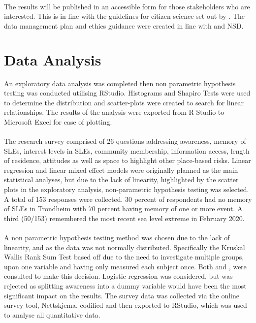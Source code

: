 \paragraph{}
The results will be published in an accessible form for those stakeholders who are interested. This is in line with the guidelines for citizen science set out by \cite{tweddle_guide_2012}. The data management plan and ethics guidance were created in line with \cite{nesh_guidelines_2022} and NSD. 

\section{Data Analysis} \label{method-data-analysis}
An exploratory data analysis was completed then non parametric hypothesis testing was conducted utilising RStudio. Histograms and Shapiro Tests were used to determine the distribution and scatter-plots were created to search for linear relationships. The results of the analysis were exported from R Studio to Microsoft Excel for ease of plotting.
\paragraph{}
The research survey comprised of 26 questions addressing awareness, memory of SLEs, interest levels in SLEs, community membership, information access, length of residence, attitudes as well as space to highlight other place-based risks. Linear regression and linear mixed effect models were originally planned as the main statistical analyses, but due to the lack of linearity, highlighted by the scatter plots in the exploratory analysis, non-parametric hypothesis testing was selected. A total of 153 responses were collected. 30 percent of respondents had no memory of SLEs in Trondheim with 70 percent having memory of one or more event. A third (50/153) remembered the most recent sea level extreme in February 2020. 
\paragraph{}
A non parametric hypothesis testing method was chosen due to the lack of linearity, and as the data was not normally distributed. Specifically the Kruskal Wallis Rank Sum Test based off \cite{hollander_nonparametric_2014} due to the need to investigate multiple groups, upon one variable and having only measured each subject once. Both \cite{tasman_how_2014} and \cite{hollander_nonparametric_2014}, were consulted to make this decision. Logistic regression was considered, but was rejected as splitting awareness into a dummy variable would have been the most significant impact on the results. The survey data was collected via the online survey tool, Nettskjema, codified and then exported to RStudio, which was used to analyse all quantitative data.
